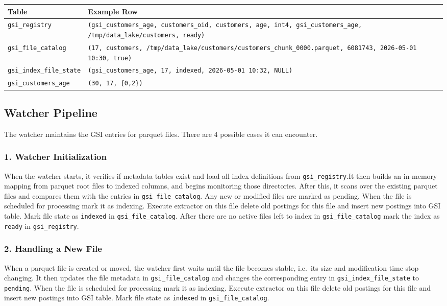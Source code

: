 \documentclass[11pt, a4paper]{article}
\begin{document}
\begin{table}[h]
\centering
\footnotesize
\renewcommand{\arraystretch}{1.05}
\begin{tabular}{|l|p{11.5cm}|}
\hline
\textbf{Table} & \textbf{Example Row} \\
\hline
\texttt{gsi\_registry} &
\texttt{(gsi\_customers\_age, customers\_oid, customers, age, int4, gsi\_customers\_age, /tmp/data\_lake/customers, ready)} \\
\hline
\texttt{gsi\_file\_catalog} &
\texttt{(17, customers, /tmp/data\_lake/customers/customers\_chunk\_0000.parquet, 6081743, 2026-05-01 10:30, true)} \\
\hline
\texttt{gsi\_index\_file\_state} &
\texttt{(gsi\_customers\_age, 17, indexed, 2026-05-01 10:32, NULL)} \\
\hline
\texttt{gsi\_customers\_age} &
\texttt{(30, 17, \{0,2\})} \\
\hline
\end{tabular}
\end{table}


\subsection{Watcher Pipeline}
The watcher maintains the GSI entries for parquet files. There are 4 possible cases it can encounter.
\subsubsection*{1. Watcher Initialization}
When the watcher starts, it verifies if metadata tables exist and load all index definitions from \texttt{gsi\_registry}.It then builds an in-memory mapping from parquet root files to indexed columns, and begins monitoring those directories. After this, it scans over the existing parquet files and compares them with the entries in \texttt{gsi\_file\_catalog}. Any new or modified files are marked as pending. When the file is scheduled for processing mark it as indexing. Execute extractor on this file delete old postings for this file and insert new postings into GSI table. Mark file state as \texttt{indexed} in \texttt{gsi\_file\_catalog}.
After there are no active files left to index in \texttt{gsi\_file\_catalog} mark the index as \texttt{ready} in \texttt{gsi\_registry}.

\subsubsection*{2. Handling a New File}
When a parquet file is created or moved, the watcher first waits until the file becomes stable, i.e.\ its size and modification time stop changing. It then updates the file metadata in \texttt{gsi\_file\_catalog} and changes the corresponding entry in \texttt{gsi\_index\_file\_state} to \texttt{pending}. When the file is scheduled for processing mark it as indexing. Execute extractor on this file delete old postings for this file and insert new postings into GSI table. Mark file state as \texttt{indexed} in \texttt{gsi\_file\_catalog}.
\end{document}
